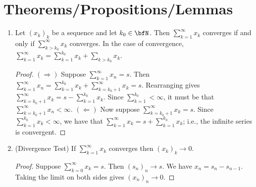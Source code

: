 \section*{Theorems/Propositions/Lemmas}
    \begin{enumerate}[label = (\arabic*)]
        \item Let $(x_k)_k$ be a sequence and let $k_0 \in \bfN$. Then $\sum_{k = 1}^\infty x_k$ converges if and only if $\sum_{k > k_0}^\infty x_k$ converges. In the case of convergence, $\sum_{k = 1}^\infty x_k = \sum_{k=1}^{k_0} x_k + \sum_{k > k_0}x_k$.
            {\color{red} \begin{proof}
                $(\Rightarrow)$ Suppose $\sum_{k = 1}^\infty x_n = s$. Then $\sum_{k = 1}^\infty x_n = \sum_{k = 1}^{k_0}x_k + \sum_{k = k_0 + 1}^\infty x_k = s$. Rearranging gives $\sum_{k = k_0 + 1}^\infty x_k = s - \sum_{k = 1}^{k_0}x_k$. Since $\sum_{k = 1}^{k_0} < \infty$, it must be that $\sum_{k = k_0 +1}^\infty x_n < \infty$. $(\Leftarrow)$ Now suppose $\sum_{k = k_0 + 1}^\infty x_k = s$. Since $\sum_{k = 1}^{k_0}x_k < \infty$, we have that $\sum_{k = 1}^\infty x_k = s + \sum_{k = 1}^{k_0}x_k$; i.e., the infinite series is convergent.
            \end{proof}}

        \item (Divergence Test) If $\sum_{k = 1}^\infty x_k$ converges then $(x_k)_k \rightarrow 0$.
            {\color{red} \begin{proof}
                Suppose $\sum_{k=0}^\infty x_k = s$. Then $(s_n)_n \rightarrow s$. We have $x_n = s_n - s_{n-1}$. Taking the limit on both sides gives $(x_n)_n \rightarrow  0$.
            \end{proof}}


\end{enumerate}
